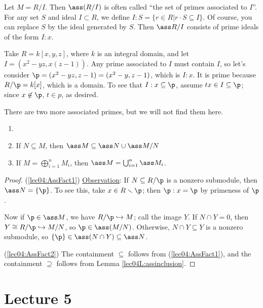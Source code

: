  Let $M = R/I$. Then $\ass (R/I)$ is often called ``the set of primes associated to
 $I$''. For any set $S$ and ideal $I\subset R$, we define $I:S = \{r\in R|r\cdot S\subseteq
 I\}$. Of course, you can replace $S$ by the ideal generated by $S$. Then $\ass R/I$
 consists of prime ideals of the form $I:x$.

 \begin{example}
   Take $R=k[x,y,z]$, where $k$ is an integral domain, and let $I = (x^2-yz,x(z-1))$. Any
   prime associated to $I$ must contain $I$, so let's consider
   $\p=(x^2-yz,z-1)=(x^2-y,z-1)$, which is $I:x$. It is prime because $R/\p = k[x]$,
   which is a domain. To see that $I:x\subseteq \p$, assume $tx\in I\subseteq \p$; since
   $x\not\in \p$, $t\in p$, as desired.

   There are two more associated primes, but we will not find them here.
 \end{example}

 \begin{proposition}
   \begin{enumerate}
     \item[]
     \item \label{lec04:AssFact1} If $N\subseteq M$, then
        $\ass M \subseteq \ass N \cup \ass M/N$
     \item \label{lec04:AssFact2} If $M = \bigoplus_{i=1}^n M_i$, then
        $\ass M = \bigcup_{i=1}^n \ass M_i$.
   \end{enumerate}
 \end{proposition}
 \begin{proof}
   (\ref{lec04:AssFact1}) \underline{Observation}: If $N\subseteq R/\p$ is a nonzero
   submodule, then $\ass N=\{\p\}$. To see this, take $x\in R\smallsetminus \p$; then
   $\p:x=\p$ by primeness of $\p$.

   Now if $\p\in \ass M$, we have $R/\p\hookrightarrow M$; call the image $Y$. If $N\cap
   Y=0$, then $Y\cong R/\p\hookrightarrow M/N$, so $\p\in \ass (M/N)$. Otherwise, $N\cap
   Y\subseteq Y$ is a nonzero submodule, so $\{\p\} \in \ass (N\cap Y)\subseteq \ass N$.

   (\ref{lec04:AssFact2}) The containment $\subseteq$ follows from
   (\ref{lec04:AssFact1}), and the containment $\supseteq$ follows from Lemma
   \ref{lec04L:assinclusion}.
 \end{proof}
 \setcounter{lecture}{5}
 \section{Lecture 5}

